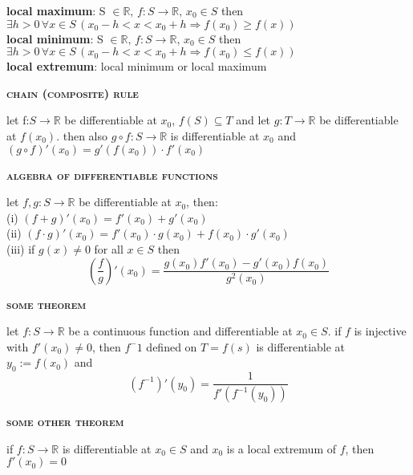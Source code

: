 \documentclass[a4paper]{article}
\begin{document}
\begin{multicols}{2}
\begin{framed}
	\noindent
	\textbf{local maximum}: S $\in \mathbb{R}, \, f: S \rightarrow \mathbb{R}, \, x_0 \in S$ then $\exists h > 0 \, \forall x \in S \, (x_0 - h < x < x_0 + h \Rightarrow f(x_0) \geq f(x))$\\
	\textbf{local minimum}: S $\in \mathbb{R}, \, f: S \rightarrow \mathbb{R}, \, x_0 \in S$ then $\exists h > 0 \, \forall x \in S \, (x_0 - h < x < x_0 + h \Rightarrow f(x_0) \leq f(x))$\\
	\textbf{local extremum}: local minimum or local maximum
\end{framed}

\begin{framed}
	\begin{center}
		\textbf{\textsc{chain (composite) rule}}
	\end{center}
	let f:$S \rightarrow \mathbb{R}$ be differentiable at $x_0$, $f(S) \subseteq T$ and let $g: T \rightarrow \mathbb{R}$ be differentiable at $f(x_0)$. then also $g \circ f: S \rightarrow \mathbb{R}$ is differentiable at $x_0$ and
	$(g \circ f)'(x_0) = g'(f(x_0))\cdot f'(x_0)$
\end{framed}

\begin{framed}
	\begin{center}
		\textbf{\textsc{algebra of differentiable functions}}
	\end{center}
	let $f, g:S \rightarrow \mathbb{R}$ be differentiable at $x_0$, then:\\
	(i) $(f + g)'(x_0) = f'(x_0) + g'(x_0)$\\
	(ii) $(f \cdot g)'(x_0) = f'(x_0) \cdot g(x_0) + f(x_0) \cdot g'(x_0)$\\
	(iii) if $g(x) \neq 0$ for all $x \in S$ then $$(\frac{f}{g})'(x_0) = \frac{g(x_0)f'(x_0) - g'(x_0)f(x_0)}{g^2(x_0)}$$
\end{framed}

\begin{framed}
	\begin{center}
		\textbf{\textsc{some theorem}}
	\end{center}
	let $f:S \rightarrow \mathbb{R}$ be a continuous function and differentiable at $x_0 \in S$. if $f$ is injective with $f'(x_0) \neq 0$, then $f^-1$ defined on $T=f(s)$ is differentiable at $y_0 := f(x_0)$ and $$(f^{-1})'(y_0) = \frac{1}{f'(f^{-1}(y_0))}$$
\end{framed}

\begin{framed}
	\begin{center}
		\textbf{\textsc{some other theorem}}
	\end{center}
	if $f:S \rightarrow \mathbb{R}$ is differentiable at $x_0 \in S$ and $x_0$ is a local extremum of $f$, then $f'(x_0) = 0$
\end{framed}


\end{multicols}
\end{document}
